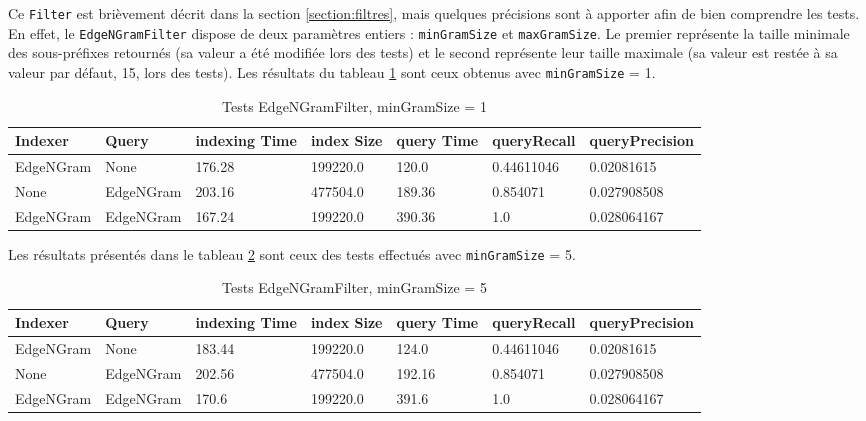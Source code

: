 Ce \texttt{Filter} est brièvement décrit dans la section \ref{section:filtres}, mais quelques précisions sont à apporter afin de bien comprendre les tests. En effet, le \texttt{EdgeNGramFilter} dispose de deux paramètres entiers : \texttt{minGramSize} et \texttt{maxGramSize}. Le premier représente la taille minimale des sous-préfixes retournés (sa valeur a été modifiée lors des tests) et le second représente leur taille maximale (sa valeur est restée à sa valeur par défaut, 15, lors des tests). Les résultats du tableau \ref{tab:tests_EdgeNGramFilter1} sont ceux obtenus avec \texttt{minGramSize} = 1.

\begin{table}[!htbp]
    \hspace{-2cm}
                \begin{tabular}{|p{2cm}|p{2cm}|p{2cm}|p{2cm}|p{2.5cm}|p{2.5cm}|p{2.5cm}|}
                    \hline
                    \textbf{Indexer} & \textbf{Query} & \textbf{indexing Time} & \textbf{index Size} & \textbf{query Time} & \textbf{queryRecall} & \textbf{queryPrecision}\\
                    \hline
EdgeNGram & None & 176.28 & 199220.0 & 120.0 & 0.44611046 & 0.02081615\\
		\hline
None & EdgeNGram & 203.16 & 477504.0 & 189.36 & 0.854071 & 0.027908508\\
		\hline
EdgeNGram & EdgeNGram & 167.24 & 199220.0 & 390.36 & 1.0 & 0.028064167\\
                    \hline
                \end{tabular}
                \caption{Tests EdgeNGramFilter, minGramSize = 1}
                \label{tab:tests_EdgeNGramFilter1}
            \end{table}

Les résultats présentés dans le tableau \ref{tab:tests_EdgeNGramFilter5} sont ceux des tests effectués avec \texttt{minGramSize} = 5.

\begin{table}[!htbp]
    \hspace{-2cm}
                \begin{tabular}{|p{2cm}|p{2cm}|p{2cm}|p{2cm}|p{2.5cm}|p{2.5cm}|p{2.5cm}|}
                    \hline
                    \textbf{Indexer} & \textbf{Query} & \textbf{indexing Time} & \textbf{index Size} & \textbf{query Time} & \textbf{queryRecall} & \textbf{queryPrecision}\\
                    \hline
EdgeNGram & None & 183.44 & 199220.0 & 124.0 & 0.44611046 & 0.02081615\\
		\hline
None & EdgeNGram & 202.56 & 477504.0 & 192.16 & 0.854071 & 0.027908508\\
		\hline
EdgeNGram & EdgeNGram & 170.6 & 199220.0 & 391.6 & 1.0 & 0.028064167\\
                    \hline
                \end{tabular}
                \caption{Tests EdgeNGramFilter, minGramSize = 5}
                \label{tab:tests_EdgeNGramFilter5}
            \end{table}

